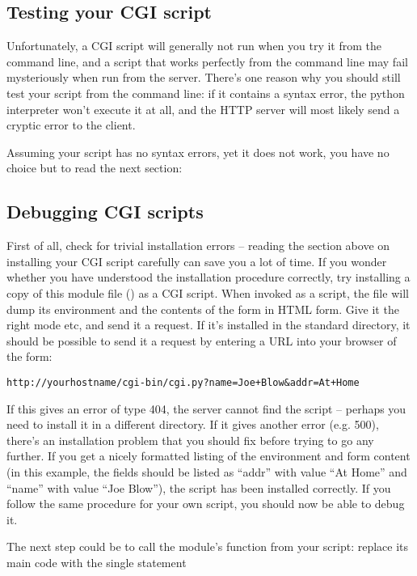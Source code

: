 \subsection{Testing your CGI script}

Unfortunately, a CGI script will generally not run when you try it
from the command line, and a script that works perfectly from the
command line may fail mysteriously when run from the server.  There's
one reason why you should still test your script from the command
line: if it contains a syntax error, the python interpreter won't
execute it at all, and the HTTP server will most likely send a cryptic
error to the client.

Assuming your script has no syntax errors, yet it does not work, you
have no choice but to read the next section:


\subsection{Debugging CGI scripts}

First of all, check for trivial installation errors -- reading the
section above on installing your CGI script carefully can save you a
lot of time.  If you wonder whether you have understood the
installation procedure correctly, try installing a copy of this module
file () as a CGI script.  When invoked as a script, the file
will dump its environment and the contents of the form in HTML form.
Give it the right mode etc, and send it a request.  If it's installed
in the standard  directory, it should be possible to send it a
request by entering a URL into your browser of the form:

\bcode\begin{verbatim}
http://yourhostname/cgi-bin/cgi.py?name=Joe+Blow&addr=At+Home
\end{verbatim}\ecode
%
If this gives an error of type 404, the server cannot find the script
-- perhaps you need to install it in a different directory.  If it
gives another error (e.g.  500), there's an installation problem that
you should fix before trying to go any further.  If you get a nicely
formatted listing of the environment and form content (in this
example, the fields should be listed as ``addr'' with value ``At Home''
and ``name'' with value ``Joe Blow''), the  script has been
installed correctly.  If you follow the same procedure for your own
script, you should now be able to debug it.

The next step could be to call the  module's 
function from your script: replace its main code with the single
statement

